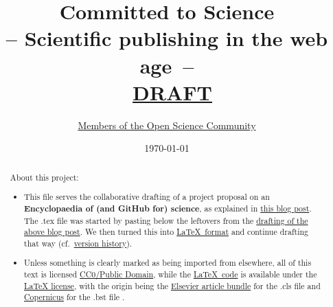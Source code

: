\documentclass[final,authoryear,3p]{elsarticle-open-drafting}
\begin{document}
\begin{frontmatter}
	\title{{\LARGE \bf Committed to Science}\\-- Scientific publishing in the web age~--\\ \ \href{http://en.wikiversity.org/wiki/User:OpenScientist/Open_grant_writing_-_Encyclopaedia_of_original_research}{DRAFT}}
	\author{\href{https://github.com/Daniel-Mietchen/Open-Research-Proposals/graphs/impact}{Members of the Open Science Community}}




	\date{\today}

	\begin{abstract}
		About this project:
		\begin{itemize}
			\item This file serves the collaborative drafting of a project proposal on an\\ 
			{\bf Encyclopaedia of (and GitHub for) science}, 
			as explained in \href{http://www.science3point0.com/evomri/2011/05/03/drafting-proposals-in-the-open-sketching-out-project-ideas/}{this blog post}. The .tex file was started by pasting below the leftovers from the \href{http://species-id.net/w/index.php?title=Draft:Encyclopaedia_of_original_research&oldid=5524}{drafting of the above blog post}. We then turned this into \href{http://en.wikibooks.org/wiki/LaTeX}{ \LaTeX~format} and continue drafting that way (cf.\ \href{https://github.com/Daniel-Mietchen/Open-Research-Proposals/commits/master}{version history}).
			\item Unless something is clearly marked as being imported from elsewhere, all of this text is licensed 
			\href{http://creativecommons.org/publicdomain/zero/1.0/}{CC0/Public Domain}, 
			while the \href{https://github.com/Daniel-Mietchen/Open-Research-Proposals/blob/master/open-drafting.tex}{\LaTeX~code} 
			is available under the \href{http://www.latex-project.org/lppl.txt }{LaTeX license}, with the origin being the \href{http://www.elsevier.com/wps/find/authorsview.authors/elsarticle}{Elsevier article bundle} for the .cls file and \href{http://www.earth-system-science-data.net/Copernicus.bst}{Copernicus} for the .bst file . 
			

\end{itemize}
\end{abstract}
\end{frontmatter}
\end{document}
